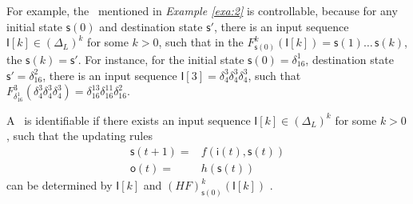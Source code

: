 \begin{example}
For example, the \BCN\ mentioned in {\em Example \ref{exa:2}} is controllable, because for any initial state $\mathsf{s}(0)$ and destination state $\mathsf{s}'$, there is an input sequence $\mathsf{I}[k]\in(\Delta_L)^k$ for some $k>0$, such that in the $F^k_{\mathsf{s}(0)}(\mathsf{I}[k])=\mathsf{s}(1) \ldots\, \mathsf{s}(k)$, the $\mathsf{s}(k)=\mathsf{s}'$. For instance, for the initial state $\mathsf{s}(0)= \delta_{16}^{1}$, destination state $\mathsf{s}'=\delta_{16}^{2}$, there is an input sequence $\mathsf{I}[3]=\delta_{4}^{3}\delta_{4}^{3}\delta_{4}^{3}$, such that $F^3_{\delta_{16}^{1}}(\delta_{4}^{3}\delta_{4}^{3}\delta_{4}^{3})=\delta_{16}^{13}\delta_{16}^{11}\delta_{16}^{2}$.
\label{exa:12}
\end{example}  

\begin{definition}[Identifiability]%
	A \BCN\ is identifiable if there exists an input sequence $\mathsf{I}[k]\in(\Delta_L)^k$ for some $k>0$, such that the updating rules
	\begin{equation*}
    		\begin{split}
		\mathsf{s}(t+1)=&f(\mathsf{i}(t),\mathsf{s}(t))\\
		\mathsf{o}(t)=&h(\mathsf{s}(t))
		\end{split}
	\end{equation*}
	can be determined by $\mathsf{I}[k]$ and $(HF)^k_{\mathsf{s}(0)}(\mathsf{I}[k])$ \cite{Cheng2011Identification}.
\end{definition}



